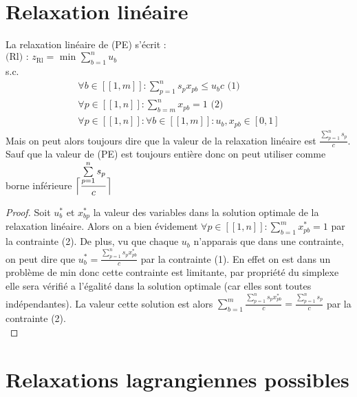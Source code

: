 \documentclass{article}
\begin{document}
\section{Relaxation linéaire}

La relaxation linéaire de (PE) s'écrit :\\
$\text{(Rl) : } z_{\text{Rl}} = \text{ min } \sum \limits_{b = 1 }^{n} u_b$\\
s.c.
\begin{align*}
 \forall b \in [\![ 1 , m ]\!] : \sum \limits_{p = 1}^{n} s_p x_{pb} \leqslant u_b c \text{ (1)}\\
 \forall p \in [\![ 1 , n ]\!] : \sum \limits_{b = m}^{n} x_{pb} = 1 \text{ (2)} \\
 \forall p \in [\![ 1 , n ]\!] : \forall b \in [\![ 1 , m ]\!] : u_b , x_{pb} \in [0,1]
\end{align*}
Mais on peut alors toujours dire que la valeur de la relaxation linéaire est $\frac{\sum \limits_{p = 1}^n s_p}{c}$. Sauf que la valeur de (PE) est toujours entière donc on peut utiliser comme borne inférieure $\Bigl\lceil\dfrac{\sum \limits_{p = 1}^n s_p}{c}\Bigr\rceil\qquad$

\begin{proof}
Soit $u^*_b$ et $x^*_{bp}$ la valeur des variables dans la solution optimale de la relaxation linéaire. Alors on a bien évidement $\forall p \in [\![ 1 , n ]\!] : \sum \limits_{b = 1}^{m} x^*_{pb} = 1$ par la contrainte (2). De plus, vu que chaque $u_b$ n’apparais que dans une contrainte, on peut dire que $u^*_b = \frac{\sum \limits_{p=1}^n s_p x^*_{pb}}{c}$ par la contrainte (1). En effet on est dans un problème de min donc cette contrainte est limitante, par propriété du simplexe elle sera vérifié a l'égalité dans la solution optimale (car elles sont toutes indépendantes). La valeur cette solution est alors $\sum \limits_{b = 1}^m  \frac{\sum \limits_{p=1}^n s_p x^*_{pb}}{c} = \frac{\sum \limits_{p = 1}^n s_p}{c}$ par la contrainte (2).\\
\end{proof}

\section{Relaxations lagrangiennes possibles}
\end{document}

